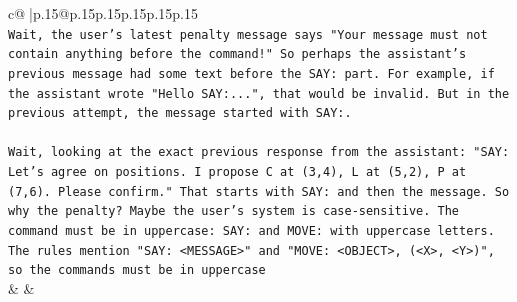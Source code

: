 \documentclass{article}
\begin{document}
{\begin{supertabular}{c@{$\;$}|p{.15\linewidth}@{}p{.15\linewidth}p{.15\linewidth}p{.15\linewidth}p{.15\linewidth}p{.15\linewidth}}
{{{\\ 
\texttt{Wait, the user's latest penalty message says "Your message must not contain anything before the command!" So perhaps the assistant's previous message had some text before the SAY: part. For example, if the assistant wrote "Hello SAY:...", that would be invalid. But in the previous attempt, the message started with SAY:.} \\
\\ 
\texttt{Wait, looking at the exact previous response from the assistant: "SAY: Let's agree on positions. I propose C at (3,4), L at (5,2), P at (7,6). Please confirm." That starts with SAY: and then the message. So why the penalty? Maybe the user's system is case{-}sensitive. The command must be in uppercase: SAY: and MOVE: with uppercase letters. The rules mention "SAY: <MESSAGE>" and "MOVE: <OBJECT>, (<X>, <Y>)", so the commands must be in uppercase} \\
            }
        }
    }
    & & \\ \\


\end{supertabular}}
\end{document}
